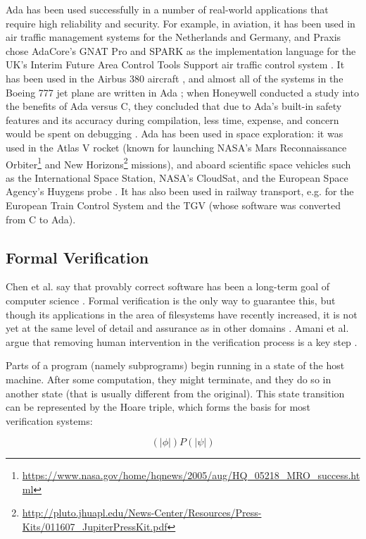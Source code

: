 Ada has been used successfully in a number of real-world applications that require high reliability and security.
For example, in aviation, it has been used in air traffic management systems for the Netherlands and Germany, and Praxis chose AdaCore's GNAT Pro and SPARK as the implementation language for the UK's Interim Future Area Control Tools Support air traffic control system \cite{adacore2007}.
It has been used in the Airbus 380 aircraft \cite{feldman2014}, and almost all of the systems in the Boeing 777 jet plane are written in Ada \cite{adaicBoeing}; when Honeywell conducted a study into the benefits of Ada versus C, they concluded that due to Ada's built-in safety features and its accuracy during compilation, less time, expense, and concern would be spent on debugging \cite{adaicBoeing}.
Ada has been used in space exploration: it was used in the Atlas V rocket (known for launching NASA's Mars Reconnaissance Orbiter\footnote{\url{https://www.nasa.gov/home/hqnews/2005/aug/HQ_05218_MRO_success.html}} and New Horizons\footnote{\url{http://pluto.jhuapl.edu/News-Center/Resources/Press-Kits/011607_JupiterPressKit.pdf}} missions), and aboard scientific space vehicles such as the International Space Station, NASA's CloudSat, and the European Space Agency's Huygens probe \cite{feldman2014}.
It has also been used in railway transport, e.g. for the European Train Control System and the TGV (whose software was converted from C to Ada).

\subsection{Formal Verification}
Chen et al. say that provably correct software has been a long-term goal of computer science \cite{chen2015}.
Formal verification is the only way to guarantee this, but though its applications in the area of filesystems have recently increased, it is not yet at the same level of detail and assurance as in other domains \cite{amani2016}.
Amani et al. argue that removing human intervention in the verification process is a key step \cite{amani2016}.

Parts of a program (namely subprograms) begin running in a state of the host machine.
After some computation, they might terminate, and they do so in another state (that is usually different from the original).
This state transition can be represented by the Hoare triple, which forms the basis for most verification systems:

$$(\!|\phi|\!) P (\!|\psi|\!)$$

